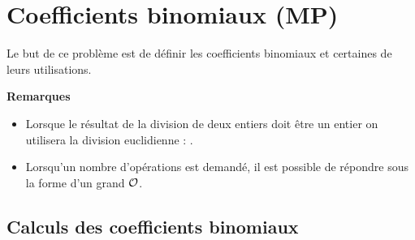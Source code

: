 \chapter{Coefficients binomiaux (MP)}

Le but de ce problème est de définir les coefficients binomiaux et certaines de leurs utilisations. 

\medskip

{\bf Remarques}
\begin{itemize}
    \item Lorsque le résultat de la division de deux entiers doit être un entier on utilisera la division euclidienne : .

\item Lorsqu'un nombre d'opérations est demandé, il est possible de répondre sous la forme d'un grand ${\cal O}$.
\end{itemize}
\section{Calculs des coefficients binomiaux} 
